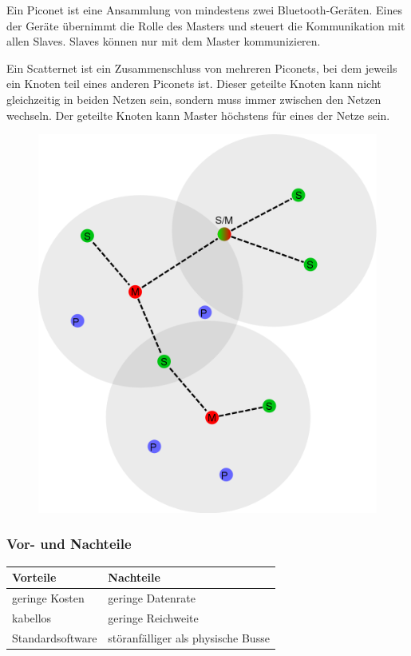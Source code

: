 Ein Piconet ist eine Ansammlung von mindestens zwei Bluetooth-Geräten. Eines der Geräte übernimmt die Rolle des Masters und steuert die Kommunikation mit allen Slaves. Slaves können nur mit dem Master kommunizieren.

Ein Scatternet ist ein Zusammenschluss von mehreren Piconets, bei dem jeweils ein Knoten teil eines anderen Piconets ist. Dieser geteilte Knoten kann nicht gleichzeitig in beiden Netzen sein, sondern muss immer zwischen den Netzen wechseln. Der geteilte Knoten kann Master höchstens für eines der Netze sein.

\begin{figure}[h!]
	\includegraphics[width=0.7\linewidth]{pico-scatternet.png}
	\label{fig:pico}
\end{figure}

\subsubsection{Vor- und Nachteile}
\begin{tabular}{l|l}
	\textbf{Vorteile} & \textbf{Nachteile}\\
	\hline geringe Kosten & geringe Datenrate\\
	\hline kabellos & geringe Reichweite\\
	\hline Standardsoftware & störanfälliger als physische Busse\\
\end{tabular}


